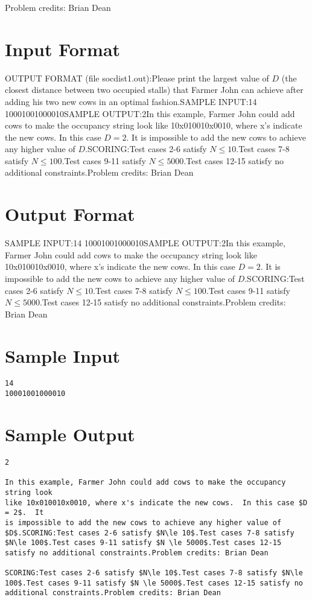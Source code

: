\documentclass[12pt]{article}
\begin{document}
Problem credits: Brian Dean



\section*{Input Format}
OUTPUT FORMAT (file socdist1.out):Please print the largest value of $D$ (the closest distance between two occupied
stalls) that Farmer John can achieve after adding his two new cows in an optimal
fashion.SAMPLE INPUT:14
10001001000010SAMPLE OUTPUT:2In this example, Farmer John could add cows to make the occupancy string look
like 10x010010x0010, where x's indicate the new cows.  In this case $D = 2$.  It
is impossible to add the new cows to achieve any higher value of $D$.SCORING:Test cases 2-6 satisfy $N\le 10$.Test cases 7-8 satisfy $N\le 100$.Test cases 9-11 satisfy $N \le 5000$.Test cases 12-15 satisfy no additional constraints.Problem credits: Brian Dean

\section*{Output Format}
SAMPLE INPUT:14
10001001000010SAMPLE OUTPUT:2In this example, Farmer John could add cows to make the occupancy string look
like 10x010010x0010, where x's indicate the new cows.  In this case $D = 2$.  It
is impossible to add the new cows to achieve any higher value of $D$.SCORING:Test cases 2-6 satisfy $N\le 10$.Test cases 7-8 satisfy $N\le 100$.Test cases 9-11 satisfy $N \le 5000$.Test cases 12-15 satisfy no additional constraints.Problem credits: Brian Dean

\section*{Sample Input}
\begin{verbatim}
14
10001001000010
\end{verbatim}

\section*{Sample Output}
\begin{verbatim}
2

In this example, Farmer John could add cows to make the occupancy string look
like 10x010010x0010, where x's indicate the new cows.  In this case $D = 2$.  It
is impossible to add the new cows to achieve any higher value of $D$.SCORING:Test cases 2-6 satisfy $N\le 10$.Test cases 7-8 satisfy $N\le 100$.Test cases 9-11 satisfy $N \le 5000$.Test cases 12-15 satisfy no additional constraints.Problem credits: Brian Dean

SCORING:Test cases 2-6 satisfy $N\le 10$.Test cases 7-8 satisfy $N\le 100$.Test cases 9-11 satisfy $N \le 5000$.Test cases 12-15 satisfy no additional constraints.Problem credits: Brian Dean
\end{verbatim}
\end{document}
